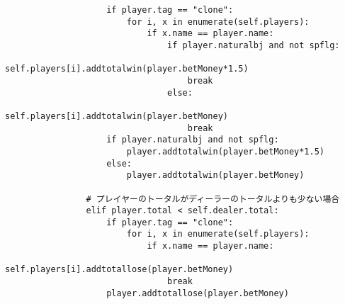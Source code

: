 \begin{itemize}
\begin{lstlisting}
                    if player.tag == "clone":
                        for i, x in enumerate(self.players):
                            if x.name == player.name:
                                if player.naturalbj and not spflg:
                                    self.players[i].addtotalwin(player.betMoney*1.5)
                                    break
                                else:
                                    self.players[i].addtotalwin(player.betMoney)
                                    break
                    if player.naturalbj and not spflg:
                        player.addtotalwin(player.betMoney*1.5)
                    else:
                        player.addtotalwin(player.betMoney)

                # プレイヤーのトータルがディーラーのトータルよりも少ない場合
                elif player.total < self.dealer.total:
                    if player.tag == "clone":
                        for i, x in enumerate(self.players):
                            if x.name == player.name:
                                self.players[i].addtotallose(player.betMoney)
                                break
                    player.addtotallose(player.betMoney)


\end{lstlisting}
\end{itemize}
